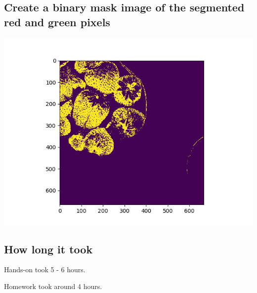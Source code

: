 \documentclass{article}
\begin{document}
    \subsection{Create a binary mask image of the segmented red and green pixels}
        \includegraphics[height=100mm]{combined_red_green_90}

    \subsection{How long it took}
    Hands-on took 5 - 6 hours. 
    
    \noindent Homework took around 4 hours.
\end{document}
